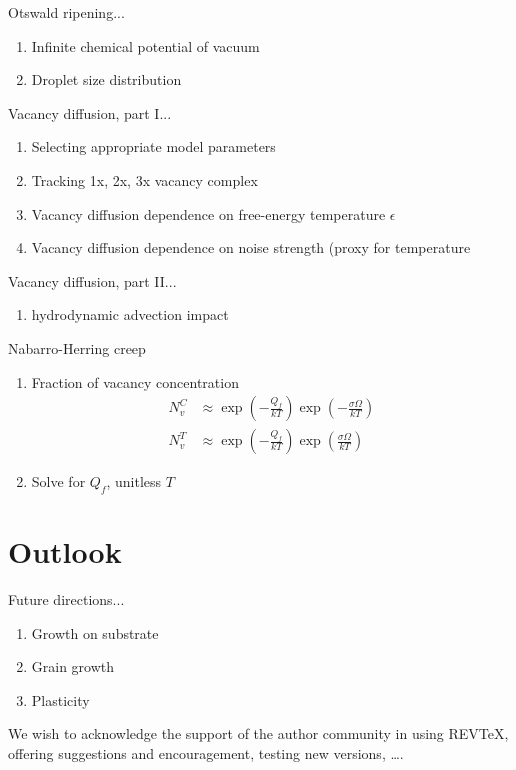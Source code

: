 \documentclass[%
 reprint,
 amsmath,amssymb,
 aps,
 prl,
]{revtex4-2}
\begin{document}
Otswald ripening...
\begin{enumerate}
    \item Infinite chemical potential of vacuum
    \item Droplet size distribution
\end{enumerate}

Vacancy diffusion, part I...
\begin{enumerate}
    \item Selecting appropriate model parameters
    \item Tracking 1x, 2x, 3x vacancy complex
    \item Vacancy diffusion dependence on free-energy temperature $\epsilon$
    \item Vacancy diffusion dependence on noise strength (proxy for temperature
\end{enumerate}

Vacancy diffusion, part II...
\begin{enumerate}
    \item hydrodynamic advection impact
\end{enumerate}

Nabarro-Herring creep
\begin{enumerate}
    \item Fraction of vacancy concentration
        \begin{align}
        N_v^C &\approx \exp \left( -\frac{Q_f}{kT} \right) \exp \left( -\frac{\sigma \Omega}{kT} \right) \\
        N_v^T &\approx \exp \left( -\frac{Q_f}{kT} \right) \exp \left( \frac{\sigma \Omega}{kT} \right)
        \end{align}
    \item Solve for $Q_f$, unitless $T$
\end{enumerate}

\section{Outlook}

Future directions...
\begin{enumerate}
    \item Growth on substrate
    \item Grain growth
    \item Plasticity
\end{enumerate}

\begin{acknowledgments}
We wish to acknowledge the support of the author community in using
REV\TeX{}, offering suggestions and encouragement, testing new versions,
\dots.
\end{acknowledgments}
\end{document}
